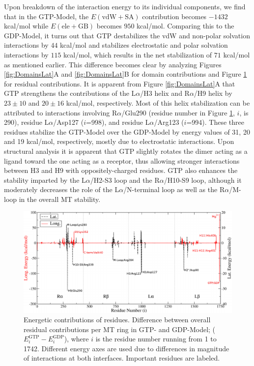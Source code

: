 \documentclass[11pt]{report}
\begin{document}
Upon breakdown of the interaction energy to its individual components, we find that
in the GTP-Model, the $E(\text{vdW}+\text{SA})$ contribution becomes
$-1432$ kcal/mol while $E(\text{ele}+\text{GB})$ becomes
$950$ kcal/mol. Comparing this to the GDP-Model, it turns 
out that GTP destabilizes the vdW and non-polar solvation interactions by 
$44$ kcal/mol and stabilizes electrostatic and polar solvation 
interactions by $115$ kcal/mol, which results in the net stabilization of
$71$ kcal/mol as mentioned earlier. This difference becomes clear 
by analyzing Figures \ref{fig:DomainsLat}A and \ref{fig:DomainsLat}B for domain
contributions and Figure \ref{fig:Residues} for residual contributions.
It is apparent from Figure \ref{fig:DomainsLat}A that GTP strengthens
the contributions of the L$\alpha$/H3 helix and R$\alpha$/H9 helix by 
$23\pm10$ and $20\pm16$ kcal/mol, respectively.
Most of this helix stabilization can be attributed to interactions
involving R$\alpha$/Glu290 (residue number in Figure \ref{fig:Residues}, $i$, is 290), residue 
L$\alpha$/Asp127 ($i$=998), and residue
L$\alpha$/Arg123 ($i$=994). These three residues stabilize the
GTP-Model over the GDP-Model by energy values of 31, 20 and 19 kcal/mol, respectively, mostly due to electrostatic interactions.
Upon structural analysis it is apparent that GTP slightly 
rotates the dimer acting as a ligand toward the one
acting as a receptor, thus allowing
stronger interactions between H3 and H9 with oppositely-charged residues.
GTP also enhances
the stability imparted by the L$\alpha$/H2-S3 loop and the
R$\alpha$/H10-S9 loop, although it moderately decreases the role
of the
L$\alpha$/N-terminal loop as well as the R$\alpha$/M-loop in the overall MT stability.

\begin{figure}[h]
  \centering
 \includegraphics[width=0.99\linewidth]{images/Fig5.pdf}
 \caption[Energetic contributions of residues]{ {Energetic contributions of residues.} Difference between overall residual contributions per MT ring in GTP- and GDP-Model; ($E_{i}^{\text{GTP}} - E_{i}^{\text{GDP}}$), where $i$ is the residue number running from 1 to 1742. Different energy axes are used due to differences in magnitude of interactions at both interfaces. Important residues are labeled.}
  \label{fig:Residues}
\end{figure}
\end{document}
